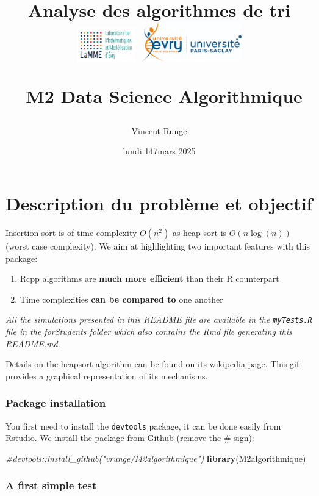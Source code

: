 \documentclass[
]{article}
\title{Analyse des algorithmes de tri\\
\includegraphics[width=1in,height=\textheight]{Images/logo_lamme.png}
\includegraphics[width=1.7in,height=\textheight]{Images/logo_UEVE.png}\\
\strut ~M2 Data Science Algorithmique}
\author{Vincent Runge}
\date{lundi 147mars 2025}
\newenvironment{Shaded}{\begin{snugshade}}{\end{snugshade}}
\newcommand{\CommentTok}[1]{\textcolor[rgb]{0.56,0.35,0.01}{\textit{#1}}}
\newcommand{\FunctionTok}[1]{\textcolor[rgb]{0.13,0.29,0.53}{\textbf{#1}}}
\newcommand{\NormalTok}[1]{#1}
\providecommand{\tightlist}{%
  \setlength{\itemsep}{0pt}\setlength{\parskip}{0pt}}
\begin{document}
\maketitle

{
\hypersetup{linkcolor=}
\setcounter{tocdepth}{2}
\tableofcontents
}
\noindent\hrulefill

\section{Description du problème et
objectif}\label{description-du-probluxe8me-et-objectif}

Insertion sort is of time complexity \textbf{\(O(n^2)\)} as heap sort is
\textbf{\(O(n\log(n))\)} (worst case complexity). We aim at highlighting
two important features with this package:

\begin{enumerate}
\def\labelenumi{\arabic{enumi}.}
\tightlist
\item
  Rcpp algorithms are \textbf{much more efficient} than their R
  counterpart
\item
  Time complexities \textbf{can be compared to} one another
\end{enumerate}

\emph{All the simulations presented in this README file are available in
the \texttt{myTests.R} file in the forStudents folder which also
contains the Rmd file generating this README.md.}

Details on the heapsort algorithm can be found on
\href{https://en.wikipedia.org/wiki/Heapsort}{its wikipedia page}. This
gif provides a graphical representation of its mechanisms.

\subsubsection{Package installation}\label{package-installation}

You first need to install the \texttt{devtools} package, it can be done
easily from Rstudio. We install the package from Github (remove the \#
sign):

\begin{Shaded}
\begin{Highlighting}[]
\CommentTok{\#devtools::install\_github("vrunge/M2algorithmique")}
\FunctionTok{library}\NormalTok{(M2algorithmique)}
\end{Highlighting}
\end{Shaded}

\subsubsection{A first simple test}\label{a-first-simple-test}
\end{document}
